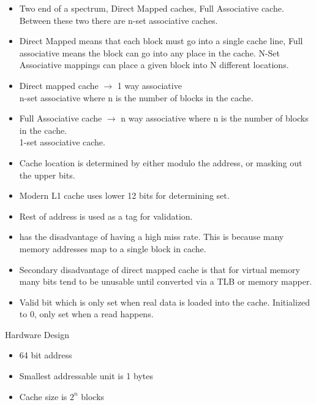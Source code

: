 \documentclass{report}
\begin{document}
\begin{description}
\begin{itemize}
            \item Two end of a spectrum, Direct Mapped caches,
                Full Associative cache. Between these two
                there are n-set associative caches.
            \item Direct Mapped means that each block must
                go into a single cache line, Full associative
                means the block can go into any place in the
                cache. N-Set Associative mappings can place
                a given block into N different locations.
            \item Direct mapped cache $\to$ 1 way associative\\
                n-set associative where n is the number of blocks
                in the cache.
            \item Full Associative cache $\to$ n way associative where
                n is the number of blocks in the cache.\\
                1-set associative cache.
        \end{itemize}
        \hline
        \begin{itemize}
            \item Cache location is determined by either modulo
                the address, or masking out the upper bits.
            \item Modern L1 cache uses lower 12 bits for determining
                set.
            \item Rest of address is used as a tag for validation.
            \item has the disadvantage of having a high miss
                rate. This is because many memory addresses map
                to a single block in cache.
            \item Secondary disadvantage of direct mapped cache
                is that for virtual memory many bits tend to
                be unusable until converted via a TLB or 
                memory mapper.
            \item Valid bit which is only set when real data
                is loaded into the cache. Initialized to 0,
                only set when a read happens.
        \end{itemize}
        Hardware Design
        \begin{itemize}
            \item  64 bit address
            \item Smallest addressable unit is 1 bytes
            \item Cache size is $2^n$ blocks

\end{itemize}
\end{description}
\end{document}

